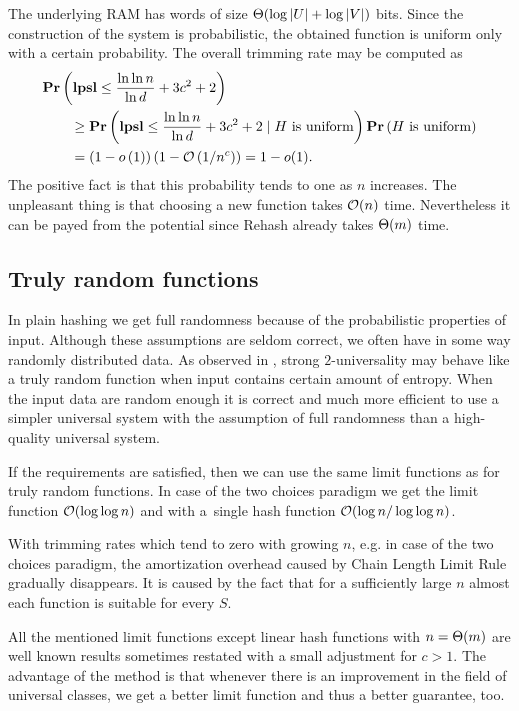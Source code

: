 The underlying RAM has words of size $\mathrm{\Theta}(\log |U| + \log |V|)$ bits. Since the construction of the system is probabilistic, the obtained function is uniform only with a certain probability. The overall trimming rate may be computed as
\[
\begin{split} 
& \mathbf{Pr}\left(\mathbf{lpsl} \leq \frac{\ln \ln n}{\ln d} + 3c^2 + 2\right) \\
	& \qquad \geq \mathbf{Pr}\left(\mathbf{lpsl} \leq \frac{\ln \ln n}{\ln d} + 3c^2 + 2 \mid H \mbox{ is uniform}\right) \mathbf{Pr}\left(H \mbox{ is uniform}\right) \\ 
	& \qquad = \left(1 - o\left(1\right)\right)\left(1 - \mathcal{O}\left({1}/{n^c}\right)\right) = 1 - o(1). \\
\end{split}
\]
The positive fact is that this probability tends to one as $n$ increases. The unpleasant thing is that choosing a new function takes $\mathcal{O}(n)$ time. Nevertheless it can be payed from the potential since Rehash already takes $\mathrm{\Theta}(m)$ time. 


\subsection{Truly random functions}
\label{subsection-truly-random-functions}
In plain hashing we get full randomness because of the probabilistic properties of input. Although these assumptions are seldom correct, we often have in some way randomly distributed data. As observed in \cite{DBLP:conf/soda/MitzenmacherV08}, strong $2$-universality may behave like a truly random function when input contains certain amount of entropy. When the input data are random enough it is correct and much more efficient to use a simpler universal system with the assumption of full randomness than a high-quality universal system.

If the requirements are satisfied, then we can use the same limit functions as for truly random functions. In case of the two choices paradigm we get the limit function $\mathcal{O}(\log \log n)$ and with a~single hash function $\mathcal{O}(\log n / \log \log n)$. 

With trimming rates which tend to zero with growing $n$, e.g. in case of the two choices paradigm, the amortization overhead caused by Chain Length Limit Rule gradually disappears. 
It is caused by the fact that for a sufficiently large $n$ almost each function is suitable for every $S$.

All the mentioned limit functions except linear hash functions with $n = \mathrm{\Theta}(m)$ are well known results sometimes restated with a small adjustment for $c > 1$. 
The advantage of the method is that whenever there is an improvement in the field of universal classes, we get a better limit function and thus a better guarantee, too.
